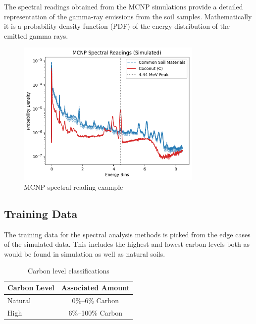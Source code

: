 \documentclass[review]{elsarticle}
\begin{document}
The spectral readings obtained from the MCNP simulations provide a detailed representation of the gamma-ray emissions from the soil samples. Mathematically it is a probability density function (PDF) of the energy distribution of the emitted gamma rays.

\begin{figure}[H]
\centering
\includegraphics[width=0.8\textwidth]{Figures/DataGeneration/MCNPSpectralReading.png}
\caption{MCNP spectral reading example}
\label{fig:mcnp_spectral}
\end{figure}

\subsection{Training Data}

The training data for the spectral analysis methods is picked from the edge cases of the simulated data. This includes the highest and lowest carbon levels both as would be found in simulation as well as natural soils.

\begin{table}[H]
\centering
\caption{Carbon level classifications}
\label{tab:carbon_levels}
\begin{tabular}{@{}lc@{}}
\toprule
Carbon Level & Associated Amount \\
\midrule
Natural & 0\%--6\% Carbon \\
High & 6\%--100\% Carbon \\
\bottomrule
\end{tabular}
\end{table}
\end{document}
